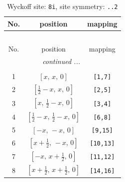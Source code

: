 \documentclass[fleqn,8pt]{jsarticle}
\begin{document}
\renewcommand{\arraystretch}{1.2}
\begin{longtable}{ccc}
\caption{Wyckoff site: {\tt 8i}, site symmetry: {\tt ..2}}
 \\
 \hline \hline
No. & position & mapping \\ \hline \endfirsthead

\multicolumn{2}{l}{\tablename\ \thetable{}} \\
 \hline \hline
No. & position & mapping \\ \hline \endhead

 \hline \hline
\multicolumn{2}{r}{\footnotesize\it continued ...} \\ \endfoot

 \hline \hline
\multicolumn{2}{r}{} \\ \endlastfoot

1 & $\left[ x,\, x,\, 0 \right]$ & {\tt [1,7]} \\ \hline
2 & $\left[ \frac{1}{2} - x,\, x,\, 0 \right]$ & {\tt [2,5]} \\ \hline
3 & $\left[ x,\, \frac{1}{2} - x,\, 0 \right]$ & {\tt [3,4]} \\ \hline
4 & $\left[ \frac{1}{2} - x,\, \frac{1}{2} - x,\, 0 \right]$ & {\tt [6,8]} \\ \hline
5 & $\left[ - x,\, - x,\, 0 \right]$ & {\tt [9,15]} \\ \hline
6 & $\left[ x + \frac{1}{2},\, - x,\, 0 \right]$ & {\tt [10,13]} \\ \hline
7 & $\left[ - x,\, x + \frac{1}{2},\, 0 \right]$ & {\tt [11,12]} \\ \hline
8 & $\left[ x + \frac{1}{2},\, x + \frac{1}{2},\, 0 \right]$ & {\tt [14,16]} \\
\end{longtable}
\renewcommand{\arraystretch}{1.2}
\end{document}
